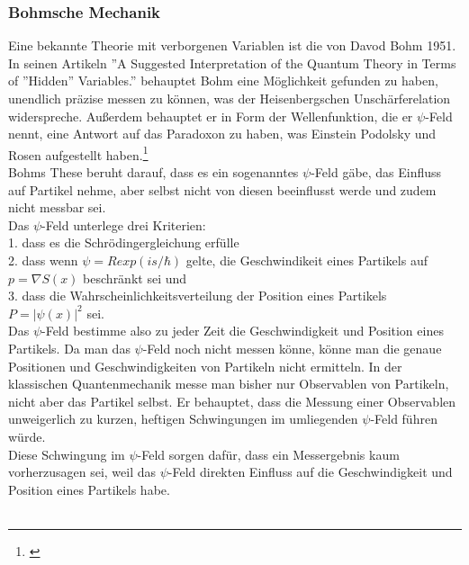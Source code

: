 \subsubsection{Bohmsche Mechanik}
\label{subsubsec:bohmsche_mechanik}
Eine bekannte Theorie mit verborgenen Variablen ist die von Davod Bohm 1951. In seinen Artikeln ''A Suggested Interpretation of the Quantum Theory in Terms of ''Hidden'' Variables.''  behauptet Bohm eine Möglichkeit gefunden zu haben, unendlich präzise messen zu können, was der Heisenbergschen Unschärferelation widerspreche. Außerdem behauptet er in Form der Wellenfunktion, die er $\psi$-Feld nennt, eine Antwort auf das Paradoxon zu haben, was Einstein Podolsky und Rosen aufgestellt haben.\footnote{\cite{PhysRev.85.166}}\\
Bohms These beruht darauf, dass es ein sogenanntes $\psi$-Feld gäbe, das Einfluss auf Partikel nehme, aber selbst nicht von diesen beeinflusst werde und zudem nicht messbar sei. \\
Das $\psi$-Feld unterlege drei Kriterien:\\
1. dass es die Schrödingergleichung erfülle\\
2. dass wenn $\psi=R exp(is/\hbar)$ gelte, die Geschwindikeit eines Partikels auf $p=\nabla S(x)$ beschränkt sei und \\
3. dass die Wahrscheinlichkeitsverteilung der Position eines Partikels $P=|\psi(x)|^2$ sei. \\
Das $\psi$-Feld bestimme also zu jeder Zeit die Geschwindigkeit und Position eines Partikels. Da man das $\psi$-Feld noch nicht messen könne, könne man die genaue Positionen und Geschwindigkeiten von Partikeln nicht ermitteln.
In der klassischen Quantenmechanik messe man bisher nur Observablen von Partikeln, nicht aber das Partikel selbst. Er behauptet, dass die Messung einer Observablen unweigerlich zu kurzen, heftigen Schwingungen im umliegenden $\psi$-Feld führen würde.\\
Diese Schwingung im $\psi$-Feld sorgen dafür, dass ein Messergebnis kaum vorherzusagen sei, weil das $\psi$-Feld direkten Einfluss auf die Geschwindigkeit und Position eines Partikels habe. \\\\
